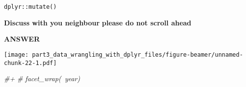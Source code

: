 \documentclass[ignorenonframetext,]{beamer}
\newenvironment{Shaded}{\begin{snugshade}}{\end{snugshade}}
\newcommand{\CommentTok}[1]{\textcolor[rgb]{0.56,0.35,0.01}{\textit{#1}}}
\newcommand{\DataTypeTok}[1]{\textcolor[rgb]{0.13,0.29,0.53}{#1}}
\newcommand{\KeywordTok}[1]{\textcolor[rgb]{0.13,0.29,0.53}{\textbf{#1}}}
\newcommand{\NormalTok}[1]{#1}
\newcommand{\OperatorTok}[1]{\textcolor[rgb]{0.81,0.36,0.00}{\textbf{#1}}}
\newcommand{\StringTok}[1]{\textcolor[rgb]{0.31,0.60,0.02}{#1}}
\begin{document}
\begin{frame}[fragile]{\texttt{dplyr::mutate()}}
\begin{block}{\textbf{Discuss with you neighbour}}
\textbf{please do not scroll ahead}

\end{block}

\begin{block}{\textbf{ANSWER}}

\begin{Shaded}
\end{Shaded}

\texttt{[image: part3\_data\_wrangling\_with\_dplyr\_files/figure-beamer/unnamed-chunk-22-1.pdf]}

\begin{Shaded}
\begin{Highlighting}[]
\CommentTok{#+}
 \CommentTok{# facet_wrap(~year)}
\end{Highlighting}
\end{Shaded}

\end{block}

\end{frame}
\end{document}
